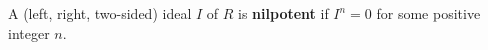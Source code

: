 A (left, right, two-sided) ideal $I$ of $R$ is \textbf{nilpotent} if $I^n = 0$ for some positive integer $n$.
